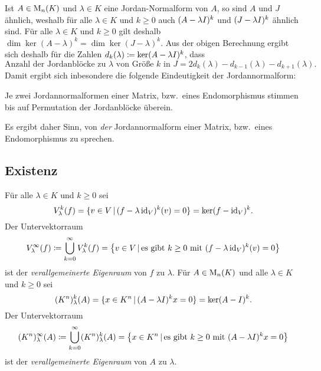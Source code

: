 Ist $A \in \matrices{n}{K}$ und $\lambda \in K$ eine Jordan-Normalform von $A$, so sind $A$ und $J$ ähnlich, weshalb für alle $\lambda \in K$ und $k \geq 0$ auch $(A - \lambda \Id)^k$ und $(J - \lambda \Id)^k$ ähnlich sind.
Für alle $\lambda \in K$ und $k \geq 0$ gilt deshalb $\dim \ker (A - \lambda)^k = \dim \ker (J - \lambda)^k$.
Aus der obigen Berechnung ergibt sich deshalb für die Zahlen $d_k(\lambda) \coloneqq \ker (A - \lambda \Id)^k$, dass
\[
    \text{Anzahl der Jordanblöcke zu $\lambda$ von Größe $k$ in $J$}
  = 2 d_k(\lambda) - d_{k-1}(\lambda) - d_{k+1}(\lambda).
\]
Damit ergibt sich inbesondere die folgende Eindeutigkeit der Jordannormalform:

\begin{proposition}
  Je zwei Jordannormalformen einer Matrix, bzw.\ eines Endomorphismus stimmen bis auf Permutation der Jordanblöcke überein.
\end{proposition}

Es ergibt daher Sinn, von \emph{der} Jordannormalform einer Matrix, bzw.\ eines Endomorphismus zu sprechen.





\subsection{Existenz}

\begin{definition}
  Für alle $\lambda \in K$ und $k \geq 0$ sei
  \[
      \heigenspace{V}{f}{\lambda}{k}
    = \{ v \in V \suchthat (f - \lambda \id_V)^k(v) = 0 \}
    = \ker (f - \id_V)^k.
  \]
  Der Untervektorraum
  \[
              \geigenspace{V}{f}{\lambda}
    \coloneqq \bigcup_{k=0}^\infty \heigenspace{V}{f}{\lambda}{k}
    =         \left\{
                v \in V
              \suchthat
                \text{es gibt $k \geq 0$ mit $(f - \lambda \id_V)^k(v) = 0$}
              \right\}
  \]
  ist der \emph{verallgemeinerte Eigenraum} von $f$ zu $\lambda$.
  Für $A \in \matrices{n}{K}$ und alle $\lambda \in K$ und $k \geq 0$ sei
  \[
      \heigenspace{(K^n)}{A}{\lambda}{k}
    = \{ x \in K^n \suchthat (A - \lambda \Id)^k x = 0 \}
    = \ker (A - \Id)^k.
  \]
  Der Untervektorraum
  \[
              \geigenspace{(K^n)}{A}{\lambda}
    \coloneqq \bigcup_{k=0}^\infty \heigenspace{(K^n)}{A}{\lambda}{k}
    =         \left\{
                x \in K^n
              \suchthat
                \text{es gibt $k \geq 0$ mit $(A - \lambda \Id)^k x = 0$}
              \right\}
  \]
  ist der \emph{verallgemeinerte Eigenraum} von $A$ zu $\lambda$.
\end{definition}

